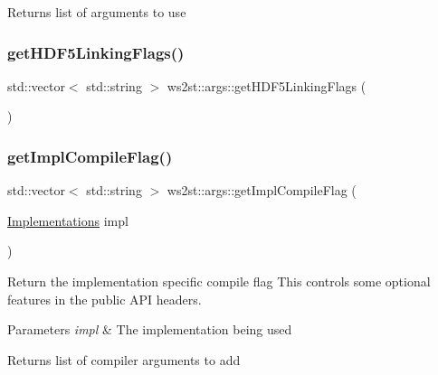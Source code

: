\begin{DoxyReturn}{Returns}
list of arguments to use 
\end{DoxyReturn}
\mbox{\label{namespacews2st_1_1args_a5eb1ca46c05701cc52a44210093c2eaa}} 
\subsubsection{\texorpdfstring{get\+H\+D\+F5\+Linking\+Flags()}{getHDF5LinkingFlags()}}
{\footnotesize\ttfamily std\+::vector$<$ std\+::string $>$ ws2st\+::args\+::get\+H\+D\+F5\+Linking\+Flags (\begin{DoxyParamCaption}{ }\end{DoxyParamCaption})}

\mbox{\label{namespacews2st_1_1args_a7909fb732055598b38d44b7e2f77aa89}} 
\subsubsection{\texorpdfstring{get\+Impl\+Compile\+Flag()}{getImplCompileFlag()}}
{\footnotesize\ttfamily std\+::vector$<$ std\+::string $>$ ws2st\+::args\+::get\+Impl\+Compile\+Flag (\begin{DoxyParamCaption}\item[{\mbox{\hyperlink{common_8hpp_aad9d1428f17c06ff77ef15dea22624dc}{Implementations}}}]{impl }\end{DoxyParamCaption})}



Return the implementation specific compile flag This controls some optional features in the public A\+PI headers. 


\begin{DoxyParams}{Parameters}
{\em impl} & The implementation being used \\
\hline
\end{DoxyParams}
\begin{DoxyReturn}{Returns}
list of compiler arguments to add 
\end{DoxyReturn}
\mbox{\label{namespacews2st_1_1args_a798dece39be1264d2e1fa55447b8ed2b}} 
